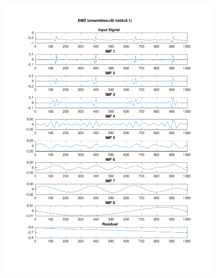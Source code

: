 \documentclass[11pt,a4paper]{article}
\begin{document}
\begin{figure}[H]
\centering
\begin{minipage}{0.48\textwidth}
	\centering
	\includegraphics[width=\textwidth]{fig/112l2_emd_ensemble.pdf}
	

\end{minipage}
\end{figure}
\end{document}
